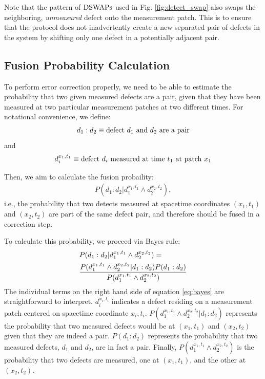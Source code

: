 \documentclass[twocolumn,superscriptaddress,aps,prb,floatfix]{revtex4-1}
\newcommand{\figref}[1]{Fig. \ref{#1}}
\renewcommand*{\emph}[1]{{\it {#1}}}
\begin{document}
 Note that the pattern of $\rm{DSWAP}s$ used in \figref{fig:detect_swap} also swaps the neighboring, \emph{unmeasured} defect onto the measurement patch.  This is to ensure that the protocol does not inadvertently create a new separated pair of defects in the system by shifting only one defect in a potentially adjacent pair. 
 
\subsection{Fusion Probability Calculation}
\label{sec:bayes_prob_calc}


To perform error correction properly, we need to be able to estimate the probability that two given measured defects are a pair, given that they have been measured at two particular measurement patches at two different times.  For notational convenience, we define:
\begin{align}
d_1 : d_2 \equiv {\rm defect}\ d_1\ {\rm and}\ d_2\ {\rm are\ a\ pair}
\end{align}
and
\begin{align}
d_i^{x_1,t_1} \equiv {\rm defect}\ d_i\ {\rm measured\ at\ time}\ t_1\ {\rm at\ patch}\ x_1
\end{align}

Then, we aim to calculate the fusion probaility:
\begin{align}
P(d_1:d_2 | d_1^{x_1,t_1} \wedge d_2^{x_2,t_2}),
\end{align}
i.e., the probability that two detects measured at spacetime coordinates $(x_1,t_1)$ and $(x_2,t_2)$ are part of the same defect pair, and therefore should be fused in a correction step.

To calculate this probability, we proceed via Bayes rule: 
\begin{align}
\label{eq:bayes}
&P(d_1:d_2 | d_1^{x_1,t_1} \wedge d_2^{x_2,t_2}) = \\ \notag
&\frac{P(d_1^{x_1,t_1} \wedge d_2^{x_2,t_2} | d_1:d_2) P(d_1 : d_2)}{P(d_1^{x_1,t_1}\wedge d_2^{x_2,t_2})}
\end{align}
The individual terms on the right hand side of equation \ref{eq:bayes} are straightforward to interpret.  $d_i^{x_i,t_i}$ indicates a defect  residing on a measurement patch centered on spacetime coordinate $x_i,t_i$.  $P(d_1^{x_1,t_1} \wedge d_2^{x_2,t_2} | d_1:d_2)$ represents the probability that two measured defects would be at $(x_1,t_1)$ and $(x_2,t_2)$ given that they are indeed a pair. $P(d_1 : d_2)$ represents the probability that two measured defects, $d_1$ and $d_2$, are in fact a pair.  Finally, $P(d_1^{x_1,t_1}\wedge d_2^{x_2,t_2})$ is the probability that two defects are measured, one at $(x_1,t_1)$, and the other at $(x_2,t_2)$.
\end{document}

